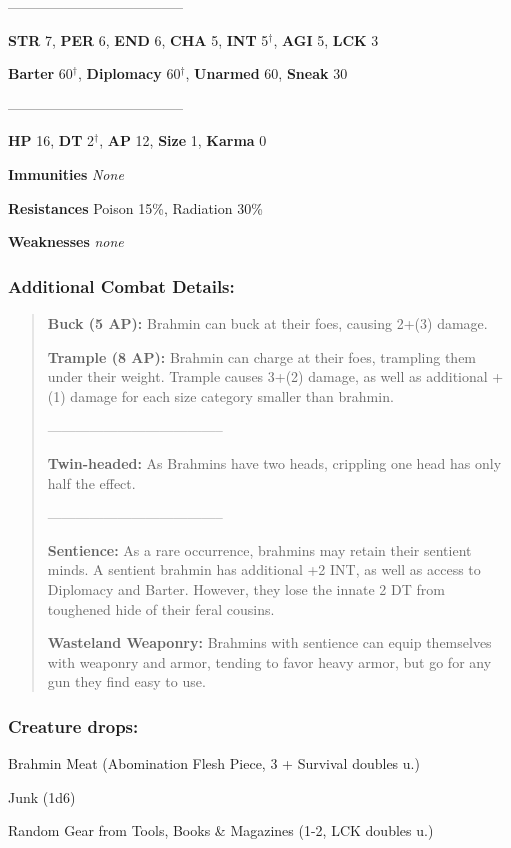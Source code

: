 \documentclass[11pt,a4paper,twocolumn]{book}
\begin{document}
		--------------------------------------

	\noindent
	\textbf{STR} 7, \textbf{PER} 6, \textbf{END} 6, \textbf{CHA} 5, \textbf{INT} 5$^{\dag}$, \textbf{AGI} 5, \textbf{LCK} 3
	
	\noindent
	\textbf{Barter} 60$^{\dag}$, \textbf{Diplomacy} 60$^{\dag}$, \textbf{Unarmed} 60, \textbf{Sneak} 30
	
	--------------------------------------
	
	\noindent
	\textbf{HP} 16, \textbf{DT} 2$^{\dag}$, \textbf{AP} 12, \textbf{Size} 1, \textbf{Karma} 0
	
	
	\noindent
	\textbf{Immunities} \emph{None}
	
	\noindent
	\textbf{Resistances} Poison 15\%, Radiation 30\%
	
	\noindent
	\textbf{Weaknesses} \emph{none} %
	
	\subsubsection*{Additional Combat Details:}
	\begin{verse}
		\textbf{Buck (5 AP):} Brahmin can buck at their foes, causing 2+(3) damage.
		
		\textbf{Trample (8 AP):} Brahmin can charge at their foes, trampling them under their weight. Trample causes 3+(2) damage, as well as additional +(1) damage for each size category smaller than brahmin.
		
		--------------------------------------
		
		\textbf{Twin-headed:} As Brahmins have two heads, crippling one head has only half the effect.
		
		--------------------------------------		
		
		\textbf{\dag Sentience:} As a rare occurrence, brahmins may retain their sentient minds. A sentient brahmin has additional +2 INT, as well as access to Diplomacy and Barter. However, they lose the innate 2 DT from toughened hide of their feral cousins.
						
		\textbf{\dag Wasteland Weaponry:} Brahmins with sentience can equip themselves with weaponry and armor, tending to favor heavy armor, but go for any gun they find easy to use.
		
	\end{verse}
	
	\subsubsection*{Creature drops:}
	\begin{compactitem}
		\item Brahmin Meat (Abomination Flesh Piece, 3 + Survival doubles u.)
		\item Junk (1d6)
		\item Random Gear from Tools, Books \& Magazines (1-2, LCK doubles u.)
	\end{compactitem}
	
\end{document}
